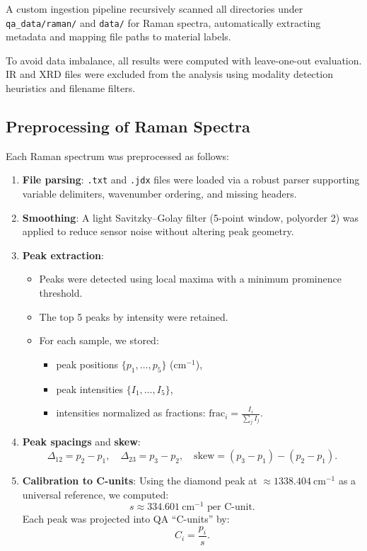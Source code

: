 \documentclass[12pt]{article}
\begin{document}
A custom ingestion pipeline recursively scanned all directories under \texttt{qa\_data/raman/} and
\texttt{data/} for Raman spectra, automatically extracting metadata and mapping file paths to material
labels.

To avoid data imbalance, all results were computed with leave-one-out evaluation.  
IR and XRD files were excluded from the analysis using modality detection heuristics and filename filters.

\subsection{Preprocessing of Raman Spectra}

Each Raman spectrum was preprocessed as follows:

\begin{enumerate}
    \item \textbf{File parsing}: \texttt{.txt} and \texttt{.jdx} files were loaded via a robust parser
          supporting variable delimiters, wavenumber ordering, and missing headers.
    \item \textbf{Smoothing}: A light Savitzky–Golay filter (5-point window, polyorder 2) was applied to
          reduce sensor noise without altering peak geometry.
    \item \textbf{Peak extraction}:
        \begin{itemize}
            \item Peaks were detected using local maxima with a minimum prominence threshold.
            \item The top 5 peaks by intensity were retained.
            \item For each sample, we stored:
                \begin{itemize}
                    \item peak positions $\{p_1,\dots,p_5\}$ (cm$^{-1}$),
                    \item peak intensities $\{I_1,\dots,I_5\}$,
                    \item intensities normalized as fractions: 
                          $\mathrm{frac}_i = \frac{I_i}{\sum_j I_j}$.
                \end{itemize}
        \end{itemize}
    \item \textbf{Peak spacings} and \textbf{skew}:
          \[
              \Delta_{12} = p_2 - p_1,\quad 
              \Delta_{23} = p_3 - p_2,\quad 
              \text{skew} = (p_3 - p_1) - (p_2 - p_1).
          \]
    \item \textbf{Calibration to C-units}:
          Using the diamond peak at $\approx 1338.404\ \mathrm{cm}^{-1}$ as a universal reference, we computed:
          \[
              s \approx 334.601\ \mathrm{cm}^{-1} \text{ per C-unit}.
          \]
          Each peak was projected into QA ``C-units'' by:
          \[
              C_i = \frac{p_i}{s}.
          \]
\end{enumerate}
\end{document}
